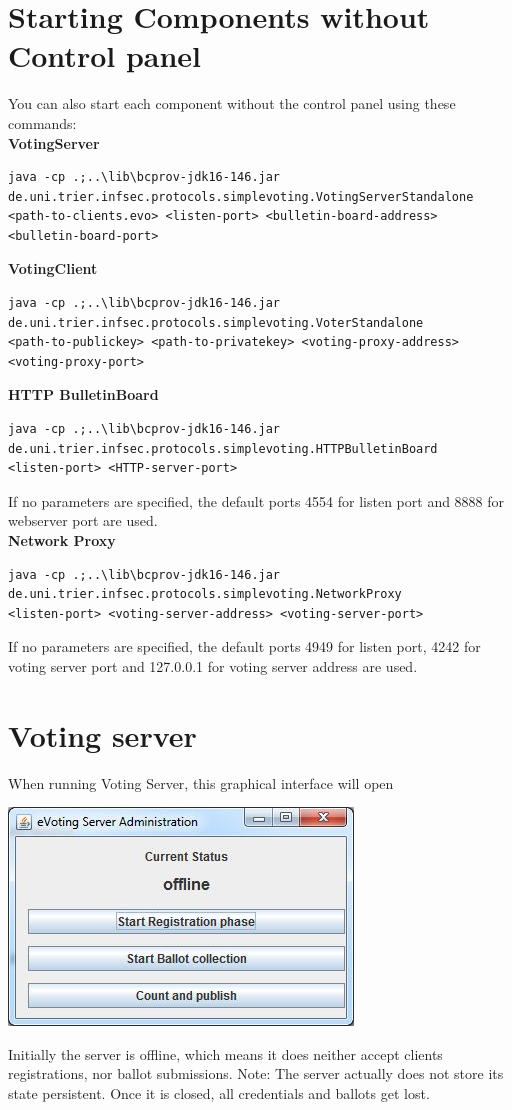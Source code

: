 \documentclass{article}
\begin{document}
\section{Starting Components without Control panel}
You can also start each component without the control panel using these commands:\\
\textbf{VotingServer}
\begin{lstlisting}
java -cp .;..\lib\bcprov-jdk16-146.jar 
de.uni.trier.infsec.protocols.simplevoting.VotingServerStandalone 
<path-to-clients.evo> <listen-port> <bulletin-board-address> <bulletin-board-port>
\end{lstlisting}
\textbf{VotingClient}
\begin{lstlisting}
java -cp .;..\lib\bcprov-jdk16-146.jar 
de.uni.trier.infsec.protocols.simplevoting.VoterStandalone
<path-to-publickey> <path-to-privatekey> <voting-proxy-address> <voting-proxy-port>
\end{lstlisting}
\textbf{HTTP BulletinBoard}
\begin{lstlisting}
java -cp .;..\lib\bcprov-jdk16-146.jar 
de.uni.trier.infsec.protocols.simplevoting.HTTPBulletinBoard 
<listen-port> <HTTP-server-port>
\end{lstlisting}
If no parameters are specified, the default ports 4554 for listen port and 8888 for webserver port are used.\\
\textbf{Network Proxy}
\begin{lstlisting}
java -cp .;..\lib\bcprov-jdk16-146.jar 
de.uni.trier.infsec.protocols.simplevoting.NetworkProxy
<listen-port> <voting-server-address> <voting-server-port>
\end{lstlisting}
If no parameters are specified, the default ports 4949 for listen port, 4242 for voting server port and 127.0.0.1 for voting server address are used.

\section{Voting server}
When running Voting Server, this graphical interface will open\\
\begin{center}\includegraphics{./server.jpg}\end{center}
Initially the server is offline, which means it does neither accept clients registrations, nor ballot submissions. Note: The server actually does not store its state persistent. Once it is closed, all credentials and ballots get lost.
\end{document}
